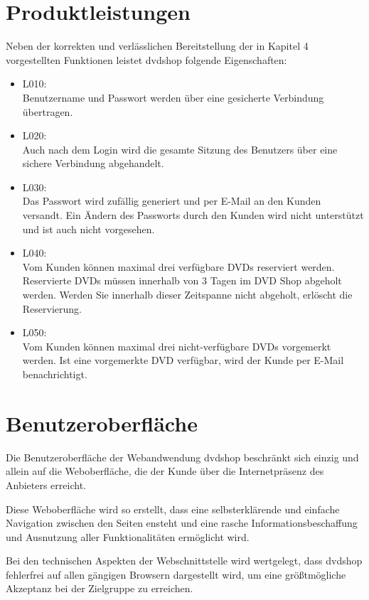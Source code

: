 \documentclass[12pt,oneside,a4paper,bibtotoc,liststotoc,pointlessnumbers]{scrartcl}
\begin{document}
\section{Produktleistungen}
Neben der korrekten und verlässlichen Bereitstellung der in Kapitel 4 vorgestellten Funktionen leistet dvdshop folgende Eigenschaften:
\begin{itemize}
\item L010: \\Benutzername und Passwort werden über eine gesicherte Verbindung übertragen.
\item L020: \\Auch nach dem Login wird die gesamte Sitzung des Benutzers über eine sichere Verbindung abgehandelt.
\item L030: \\Das Passwort wird zufällig generiert und per E-Mail an den Kunden versandt. Ein Ändern des Passworts durch den Kunden wird nicht unterstützt und ist auch nicht vorgesehen.
\item L040: \\Vom Kunden können maximal drei verfügbare DVDs reserviert werden. Reservierte DVDs
müssen innerhalb von 3 Tagen im DVD Shop abgeholt werden. Werden Sie innerhalb dieser Zeitspanne nicht abgeholt, erlöscht die Reservierung.
\item L050: \\Vom Kunden können maximal drei nicht-verfügbare DVDs vorgemerkt werden. Ist eine
vorgemerkte DVD verfügbar, wird der Kunde per E-Mail benachrichtigt.
\end{itemize}

\newpage
\section{Benutzeroberfläche}
Die Benutzeroberfläche der Webandwendung dvdshop beschränkt sich einzig und allein auf die Weboberfläche, die der Kunde über die Internetpräsenz des Anbieters erreicht.\par
Diese Weboberfläche wird so erstellt, dass eine selbsterklärende und einfache Navigation zwischen den Seiten ensteht und eine rasche Informationsbeschaffung und Ausnutzung aller Funktionalitäten ermöglicht wird.\par
Bei den technischen Aspekten der Webschnittstelle wird wertgelegt, dass dvdshop fehlerfrei auf allen gängigen Browsern dargestellt wird, um eine größtmögliche Akzeptanz bei der Zielgruppe zu erreichen.

\newpage
\end{document}
